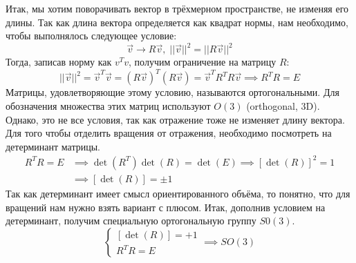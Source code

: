 Итак, мы хотим поворачивать вектор в трёхмерном пространстве, не изменяя его длины. Так как длина вектора определяется как квадрат нормы, нам необходимо, чтобы выполнялось следующее условие:
\[
\Vec{v} \rightarrow R\Vec{v}, \; ||\Vec{v}||^2 = ||R\Vec{v}||^2
\]
Тогда, записав норму как $v^Tv$, получим ограничение на матрицу $R$:
\[
||\Vec{v}||^2 = \Vec{v}^T\Vec{v} = (R\Vec{v})^T(R\Vec{v}) = \Vec{v}^T R^T R\Vec{v} \implies R^T R = E
\]
Матрицы, удовлетворяющие этому условию, называются ортогональными. Для обозначения множества этих матриц используют $O(3)$ (orthogonal, 3D). Однако, это не все условия, так как отражение тоже не изменяет длину вектора. Для того чтобы отделить вращения от отражения, необходимо посмотреть на детерминант матрицы. 
\begin{align*}
    R^T R = E &\implies \det(R^T)\det(R) = \det(E) \implies [\det(R)]^2 = 1  \\
    &\implies [\det(R)] = \pm 1
\end{align*}
Так как детерминант имеет смысл ориентированного объёма, то понятно, что для вращений нам нужно взять вариант с плюсом. Итак, дополнив условием на детерминант, получим специальную ортогональную группу $S0(3)$.
\[
\begin{cases}
    [\det(R)] = +1\\
     R^T R = E
\end{cases} \implies SO(3)
\]

